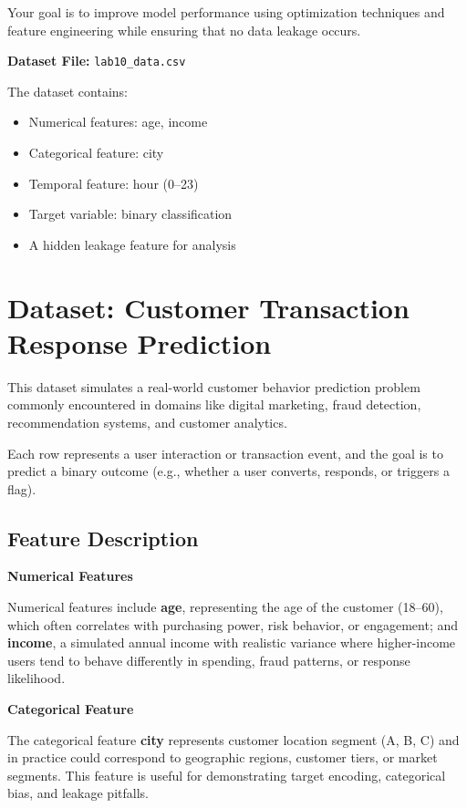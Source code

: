 \documentclass[12pt,a4paper]{article}
\begin{document}
Your goal is to improve model performance using optimization techniques and feature engineering while ensuring that no data leakage occurs.

\textbf{Dataset File:} \texttt{lab10\_data.csv}

The dataset contains:
\begin{itemize}
\item Numerical features: age, income
\item Categorical feature: city
\item Temporal feature: hour (0–23)
\item Target variable: binary classification
\item A hidden leakage feature for analysis
\end{itemize}

\vspace{6pt}
\section*{Dataset: Customer Transaction Response Prediction}

This dataset simulates a real-world customer behavior prediction problem commonly encountered in domains like digital marketing, fraud detection, recommendation systems, and customer analytics.

Each row represents a user interaction or transaction event, and the goal is to predict a binary outcome (e.g., whether a user converts, responds, or triggers a flag).

\subsection*{Feature Description}

    \textbf{Numerical Features}

Numerical features include \textbf{age}, representing the age of the customer (18--60), which often correlates with purchasing power, risk behavior, or engagement; and \textbf{income}, a simulated annual income with realistic variance where higher-income users tend to behave differently in spending, fraud patterns, or response likelihood.

    \textbf{Categorical Feature}

The categorical feature \textbf{city} represents customer location segment (A, B, C) and in practice could correspond to geographic regions, customer tiers, or market segments. This feature is useful for demonstrating target encoding, categorical bias, and leakage pitfalls.
\end{document}
